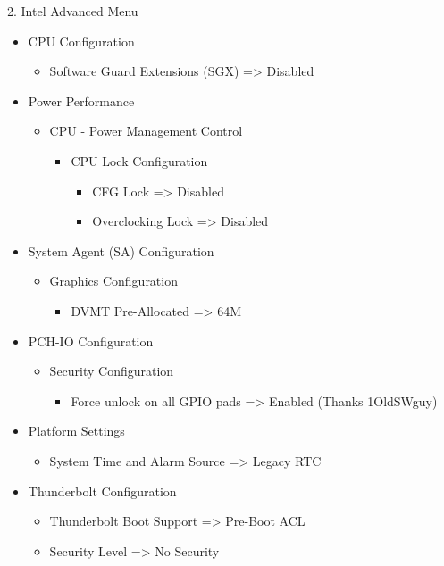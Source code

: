 \documentclass[lang=cn,12pt,chinesefont=founder]{elegantbook}
\begin{document}
2. Intel Advanced Menu
            \begin{itemize}
            \item CPU Configuration
                \begin{itemize}
                \item Software Guard Extensions (SGX) => Disabled
                \end{itemize}
            \item Power  Performance
                \begin{itemize}
                \item CPU - Power Management Control
                \begin{itemize}
                  \item CPU Lock Configuration
                  \begin{itemize}
                    \item CFG Lock => Disabled
                    \item Overclocking Lock => Disabled
                  \end{itemize}
                \end{itemize}
              \end{itemize}
            \item System Agent (SA) Configuration
                \begin{itemize}
                \item Graphics Configuration
                \begin{itemize}
                  \item DVMT Pre-Allocated => 64M
                \end{itemize}
              \end{itemize}
            \item PCH-IO Configuration
                \begin{itemize}
                \item Security Configuration
                \begin{itemize}
                  \item Force unlock on all GPIO pads => Enabled (Thanks 1OldSWguy)        
                \end{itemize}
              \end{itemize}
            \item Platform Settings
                \begin{itemize}
                \item System Time and Alarm Source => Legacy RTC
              \end{itemize}
            \item Thunderbolt Configuration
                \begin{itemize}
                  \item Thunderbolt Boot Support => Pre-Boot ACL
                  \item Security Level => No Security
                \end{itemize}
            \end{itemize}
\end{document}
